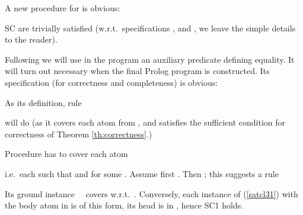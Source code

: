 \documentclass{tlp}
\begin{document}
A new procedure for   is obvious:

SC are trivially satisfied
(w.r.t.\ specifications ,
and ,
we leave the simple details to the reader).

Following \cite{howe.king.tcs-shorter} we will use in the program
an auxiliary predicate  defining equality.  It will turn out necessary
when the final Prolog program is constructed.  Its specification 
(for correctness and completeness)
is obvious:

As its definition, rule

will do
(as it covers each atom from , and satisfies the sufficient condition 
for correctness of Theorem \ref{th:correctness}.)



Procedure   has to cover each atom 

i.e.\ each  such that
 and  for
some .
Assume first .  Then ; this suggests a rule

Its ground instance 
\  \ 
covers  w.r.t.\ .  Conversely, each instance of  (\ref{satcl31})
with the body atom in  is of this form, its head is in ,
hence SC1 holds.
\end{document}
